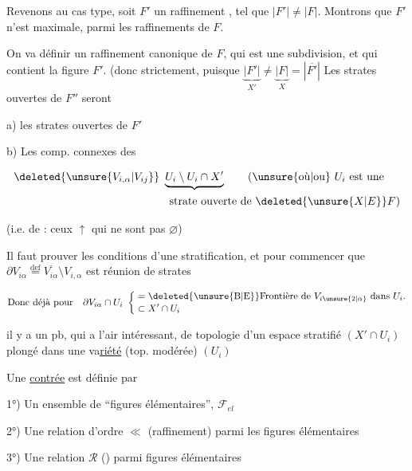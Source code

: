 Revenons au cas type, soit $F'$ un raffinement , tel que $|F'|\neq|F|$. Montrons que $F'$ n'est  maximale,  parmi les raffinements de $F$.

On va définir un raffinement canonique  de $F$, qui est  une subdivision, et qui contient la figure $F'$. (donc strictement, puisque $\underbrace{|F'|}_{X'}\neq\underbrace{|F|}_{X}=|\overline{F'}|$ Les  strates ouvertes de $F''$ seront

a) les strates ouvertes  de $F'$

b) Les comp. connexes  des

\[
\begin{aligned}
&\deleted{\unsure{V_{i,\alpha}|V_{ij}}}\ \underbrace{U_i\setminus U_i\cap X'}\qquad \text{(\unsure{où|ou} } U_i \text{ est une}\\
&\hspace{14em}\text{strate ouverte de } \deleted{\unsure{X|E}}F\text{)}
\end{aligned}
\]

(i.e. de : ceux $\uparrow$ qui ne sont pas $\varnothing$)

 Il faut prouver les conditions d'une stratification, et pour commencer que $\partial V_{i\alpha}\overset{\mathrm{def}}{=}\overline{V_{i\alpha}}\setminus V_{i,\alpha}$ est réunion de strates

\[
\text{Donc déjà pour}\quad \partial V_{i\alpha}\cap U_i\ \left\{\begin{aligned}&=\text{\deleted{\unsure{B|E}}Frontière de } V_{i\unsure{2|\alpha}}\text{ dans }U_i\text{.}\\[-2pt]&\subset X'\cap U_i\end{aligned}\right.
\]

il y a un pb, qui a l'air intéressant, de topologie d'un espace stratifié $(X'\cap U_i)$ plongé dans une va\uline{riété} (top.  modérée) $(U_i)$

Une \uline{contrée} est définie par

1°) Un ensemble de ``figures élémentaires'', $\mathcal{F}_{el}$

2°) Une relation d'ordre $\ll$  (raffinement) parmi les figures élémentaires

3°) Une relation   $\mathcal{R}$ () parmi figures élémentaires


